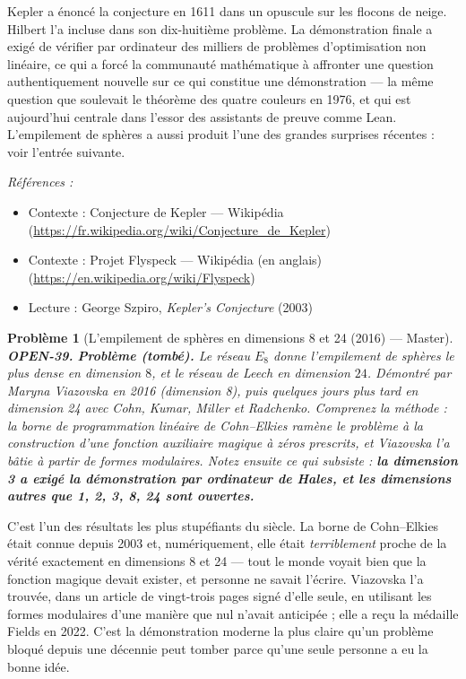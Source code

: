 \documentclass[11pt]{article}
\newtheorem{problem}{Problème}
\newenvironment{refs}{\par\small\noindent\emph{Références :}\begin{itemize}\setlength\itemsep{0pt}}{\end{itemize}\normalsize}
\begin{document}
\noindent Kepler a énoncé la conjecture en 1611 dans un opuscule sur les flocons
de neige. Hilbert l'a incluse dans son dix-huitième problème. La démonstration finale a
exigé de vérifier par ordinateur des milliers de problèmes d'optimisation non linéaire, ce
qui a forcé la communauté mathématique à affronter une question authentiquement nouvelle
sur ce qui constitue une démonstration --- la même question que soulevait le théorème des
quatre couleurs en 1976, et qui est aujourd'hui centrale dans l'essor des assistants de
preuve comme Lean. L'empilement de sphères a aussi produit l'une des grandes surprises
récentes : voir l'entrée suivante.

\begin{refs}
\item Contexte : Conjecture de Kepler --- Wikipédia (\url{https://fr.wikipedia.org/wiki/Conjecture_de_Kepler})
\item Contexte : Projet Flyspeck --- Wikipédia (en anglais) (\url{https://en.wikipedia.org/wiki/Flyspeck})
\item Lecture : George Szpiro, \textit{Kepler's Conjecture} (2003)
\end{refs}

\bigskip

\begin{problem}[{L'empilement de sphères en dimensions 8 et 24 (2016) --- Master}]
\textbf{OPEN-39.} \textbf{Problème (tombé).} Le réseau $ E_8 $ donne l'empilement de
sphères le plus dense en dimension $ 8 $, et le réseau de Leech en dimension $ 24 $.
Démontré par Maryna Viazovska en 2016 (dimension 8), puis quelques jours plus tard en
dimension 24 avec Cohn, Kumar, Miller et Radchenko. Comprenez la méthode : la borne de
programmation linéaire de Cohn--Elkies ramène le problème à la construction d'une fonction
auxiliaire \og{} magique \fg{} à zéros prescrits, et Viazovska l'a bâtie à partir de formes
modulaires. Notez ensuite ce qui subsiste : \textbf{la dimension 3 a exigé la démonstration par
ordinateur de Hales, et les dimensions autres que 1, 2, 3, 8, 24 sont ouvertes.}
\end{problem}

\noindent C'est l'un des résultats les plus stupéfiants du siècle. La borne de
Cohn--Elkies était connue depuis 2003 et, numériquement, elle était \textit{terriblement}
proche de la vérité exactement en dimensions 8 et 24 --- tout le monde voyait bien que la
fonction magique devait exister, et personne ne savait l'écrire. Viazovska l'a trouvée, dans
un article de vingt-trois pages signé d'elle seule, en utilisant les formes modulaires d'une
manière que nul n'avait anticipée ; elle a reçu la médaille Fields en 2022. C'est la
démonstration moderne la plus claire qu'un problème bloqué depuis une décennie peut tomber
parce qu'une seule personne a eu la bonne idée.
\end{document}

